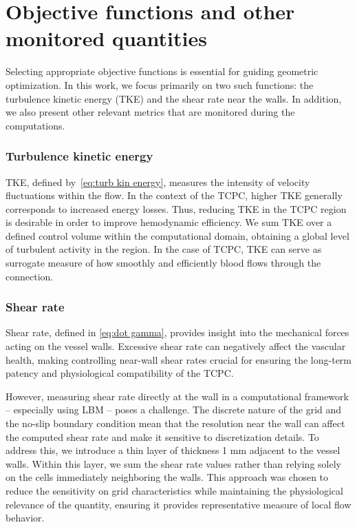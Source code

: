 \section{Objective functions and other monitored quantities}
Selecting appropriate objective functions is essential for guiding geometric optimization. In this work, we focus primarily on two such functions: the turbulence kinetic energy (TKE) and the shear rate near the walls. In addition, we also present other relevant metrics that are monitored during the computations.

\subsubsection*{Turbulence kinetic energy}
TKE, defined by~\eqref{eq:turb kin energy}, measures the intensity of velocity fluctuations within the flow. In the context of the TCPC, higher TKE generally corresponds to increased energy losses. Thus, reducing TKE in the TCPC region is desirable in order to improve hemodynamic efficiency. We sum TKE over a defined control volume within the computational domain, obtaining a global level of turbulent activity in the region. In the case of TCPC, TKE can serve as surrogate measure of how smoothly and efficiently blood flows through the connection.

\subsubsection*{Shear rate}
Shear rate, defined in \eqref{eq:dot gamma}, provides insight into the mechanical forces acting on the vessel walls. Excessive shear rate can negatively affect the vascular health, making controlling near-wall shear rates crucial for ensuring the long-term patency and physiological compatibility of the TCPC.

However, measuring shear rate directly at the wall in a computational framework -- especially using LBM -- poses a challenge. The discrete nature of the grid and the no-slip boundary condition mean that the resolution near the wall can affect the computed shear rate and make it sensitive to discretization details. To address this, we introduce a thin layer of thickness 1 mm adjacent to the vessel walls. Within this layer, we sum the shear rate values rather than relying solely on the cells immediately neighboring the walls. This approach was chosen to reduce the sensitivity on grid characteristics while maintaining the physiological relevance of the quantity, ensuring it provides representative measure of local flow behavior.

